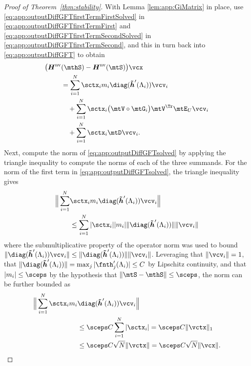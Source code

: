 \begin{proof}[Proof of Theorem~\ref{thm:stability}]
With Lemma \ref{lem:app:GiMatrix} in place, use \eqref{eq:app:outputDiffGFTfirstTermFirstSolved} in \eqref{eq:app:outputDiffGFTfirstTermFirst} and \eqref{eq:app:outputDiffGFTfirstTermSecondSolved} in \eqref{eq:app:outputDiffGFTfirstTermSecond}, and this in turn back into \eqref{eq:app:outputDiffGFT} to obtain
\begin{equation} \label{eq:app:outputDiffGFTsolved}
%
\begin{aligned}
    \big( \mtfnH^{\text{nv}} & (\mthS)-\mtfnH^{\text{nv}}(\mtS) \big) \vcx \\ & = \sum_{i=1}^{N} \sctx_{i} m_{i} \diag(\vcfnth'(\lambda_{i}))\vcv_{i} \\ & \quad + \sum_{i=1}^{N} \sctx_{i} \big( \mtV  \circ \mtG_{i} \big) \mtV^{\Tr} \mtE_{U} \vcv_{i} \\ & \quad  + \sum_{i=1}^{N} \sctx_{i} \mtD \vcv_{i}.
\end{aligned}
%
\end{equation}
%
Next, compute the norm of \eqref{eq:app:outputDiffGFTsolved} by applying the triangle inequality to compute the norms of each of the three summands. For the norm of the first term in \eqref{eq:app:outputDiffGFTsolved}, the triangle inequality gives
%
\begin{equation}
%
\begin{aligned}
    \Big\| \sum_{i=1}^{N} & \sctx_{i} m_{i} \diag(\vcfnth'(\lambda_{i}))\vcv_{i} \Big\| \\ & \leq \sum_{i=1}^{N} | \sctx_{i} | |m_{i}| \| \diag(\vcfnth'(\lambda_{i})) \| \| \vcv_{i}\|
\end{aligned}
%
\end{equation}
%
where the submultiplicative property of the operator norm was used to bound $\| \diag(\vcfnth'(\lambda_{i})) \vcv_{i}\| \leq \| \diag(\vcfnth'(\lambda_{i})) \| \| \vcv_{i}\|$. Leveraging that $\|\vcv_{i}\|=1$, that $\|\diag(\vcfnth'(\lambda_{i}))\| = \max_{j} |\fnth'_{j}(\lambda_{i})| \leq C$ by Lipschitz continuity, and that $|m_{i}| \leq \sceps$ by the hypothesis that $\|\mtS - \mthS\| \leq \sceps$, the norm can be further bounded as
%
\begin{equation}\label{eq:app:lipschitzIneq1}
%
\begin{aligned}
    \Big\| \sum_{i=1}^{N} \sctx_{i} m_{i} & \diag(\vcfnth'(\lambda_{i})) \vcv_{i} \Big\| \\ & \leq \sceps C \sum_{i=1}^{N} | \sctx_{i} | = \sceps C \| \vctx \|_{1} \\ & \leq \sceps C \sqrt{N} \| \vctx \|= \sceps C \sqrt{N} \| \vcx \|.

\end{aligned}
\end{equation}
\end{proof}
